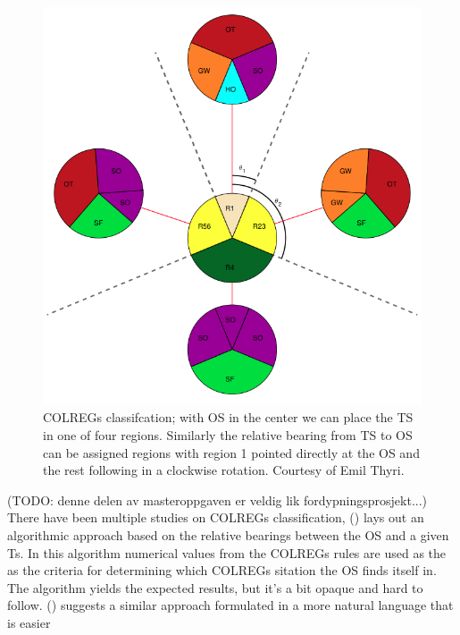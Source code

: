 \begin{figure}[ht!]
    \centering
    \includegraphics[height=0.6\textheight]{Images/COLREGs_assess.png}
    \caption{COLREGs classifcation; with OS in the center we can place the TS in one of four regions. Similarly the relative bearing from TS to OS can be assigned regions with region 1 pointed directly at the OS and the rest following in a clockwise rotation.
    Courtesy of Emil Thyri.}
    \label{FIG: COLREGs Classification}
\end{figure}
(TODO: denne delen av masteroppgaven er veldig lik fordypningsprosjekt...)
There have been multiple studies on \gls{COLREGs} classification, (\cite{woerner2016multi}) lays out an algorithmic approach based on the
relative bearings between the \gls{OS} and a given \gls{Ts}. In this algorithm numerical values from the \gls{COLREGs} rules are used as the
as the criteria for determining which \gls{COLREGs} sitation the \gls{OS} finds itself in. The algorithm yields the expected results,
but it's a bit opaque and hard to follow. (\cite{tam2010collision}) suggests a similar approach formulated in a more natural language that is easier
